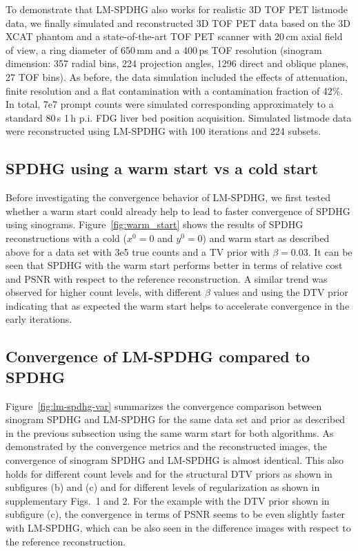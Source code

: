 To demonstrate that LM-SPDHG also works for realistic 3D TOF PET listmode data,
we finally simulated and reconstructed 3D TOF PET data based on the 3D XCAT \cite{Segars2010} phantom 
and a state-of-the-art
TOF PET scanner with 20\,cm axial field of view, a ring diameter of 650\,mm and a 400\,ps TOF 
resolution (sinogram dimension: 357 radial bins, 224 projection angles, 1296 direct and  
oblique planes, 27 TOF bins).
As before, the data simulation included the effects of attenuation, finite resolution and a
flat contamination with a contamination fraction of 42\%.
In total, 7e7 prompt counts were simulated corresponding approximately to a standard 
80\,s 1\,h p.i. FDG liver bed position acquisition.
Simulated listmode data were reconstructed using LM-SPDHG with 100 iterations and 224 subsets. 

\subsection*{SPDHG using a warm start vs a cold start}

Before investigating the convergence behavior of LM-SPDHG, we first tested whether 
a warm start could already help to lead to faster convergence of SPDHG using sinograms.
Figure~\ref{fig:warm_start} shows the results of SPDHG reconstructions with a cold 
($x^0 = 0$ and $y^0 = 0$) and warm start as described above for a data set with 3e5 true counts
and a TV prior with $\beta = 0.03$.
It can be seen that SPDHG with the warm start performs better in terms of relative cost
and PSNR with respect to the reference reconstruction.
A similar trend was observed for higher count levels, with different $\beta$ values and using
the DTV prior indicating that as expected the warm start helps to accelerate convergence
in the early iterations.

\subsection*{Convergence of LM-SPDHG compared to SPDHG}

Figure~\ref{fig:lm-spdhg-var} summarizes the convergence comparison between sinogram SPDHG and 
LM-SPDHG for the same data set and prior as described in the previous subsection using the 
same warm start for both algorithms.
As demonstrated by the convergence metrics and the reconstructed images, the convergence of
sinogram SPDHG and LM-SPDHG is almost identical.
This also holds for different count levels and for the structural DTV priors 
as shown in subfigures (b) and (c) and for different levels of regularization as shown
in supplementary Figs.~1 and 2.
For the example with the DTV prior shown in subfigure (c), the convergence in terms of
PSNR seems to be even slightly faster with LM-SPDHG, which can be also
seen in the difference images with respect to the reference reconstruction.

